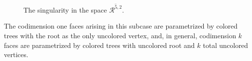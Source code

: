 \begin{rem}
\begin{center}
\begin{figure}[H]
{\begin{tikzpicture}
						
				\end{tikzpicture}}
				\caption{The singularity in the space $\overline{\mathcal{R}^{5,2}}$.}
				\label{singularity}
			\end{figure}
			
		\end{center}
		The codimension one faces arising in this subcase are parametrized by colored trees with the root as the only uncolored vertex, and, in general, codimension $k$ faces are parametrized by colored trees with uncolored root and $k$ total uncolored vertices.
	\end{rem}
	
